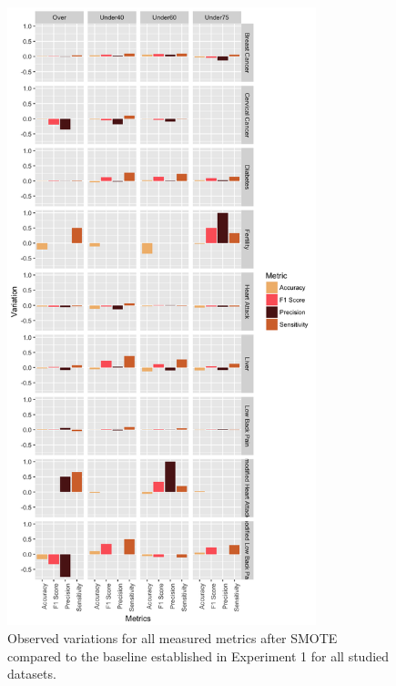 \begin{figure}[!htbp]
    \centering
    \includegraphics[width=0.8\textwidth]{ThesisTemplate/usingLatex/chapter5Images/AllMetricsPortrait.png}
    \caption{Observed variations for all measured metrics after SMOTE compared to the baseline established in Experiment 1 for all studied datasets.}
    \label{fig:my_label}
\end{figure}

